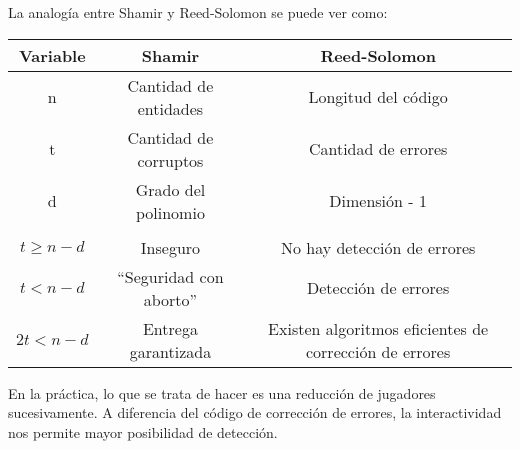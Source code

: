 \begin{itemize}
\begin{remark}
        La analogía entre Shamir y Reed-Solomon se puede ver como:

        \begin{center}
          \begin{tabular}{|c|c|c|}
            \hline
            Variable & Shamir & Reed-Solomon \\ 
            \hline
            n & Cantidad de entidades & Longitud del código \\ 
            t & Cantidad de corruptos & Cantidad de errores \\ 
            d & Grado del polinomio & Dimensión - 1 \\ 
              & & \\ 
            $t \geq n-d$ & Inseguro & No hay detección de errores \\
            $t < n-d$ & ``Seguridad con aborto'' & Detección de errores \\
            $2t < n-d$ & Entrega garantizada & Existen algoritmos eficientes de corrección de errores \\
            \hline
          \end{tabular}
        \end{center}

        En la práctica, lo que se trata de hacer es una reducción de jugadores sucesivamente.
        A diferencia del código de corrección de errores, la interactividad nos permite mayor posibilidad de detección.
      \end{remark}
  \end{itemize}

